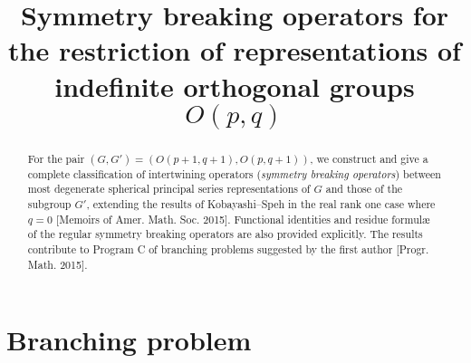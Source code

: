 \documentclass[reqno,12pt]{pja00} %
\theoremstyle{definition}
\theoremstyle{exampstyle} \newtheorem{examp}[theorem]{Theorem}
\begin{document}
\title{Symmetry breaking operators for the restriction of representations of indefinite orthogonal groups $O(p,q)$}

  \maketitle
\begin{abstract}
	For the pair $(G, G') =(O(p+1, q+1), O(p,q+1))$, we construct and give a complete classification of intertwining operators (\textit{symmetry breaking operators})
	between
most degenerate spherical
principal series representations of 
$G$ and those of the subgroup $G'$, extending the results of Kobayashi--Speh in the real rank one case where $q=0$
 [Memoirs of Amer. Math. Soc. 2015].
Functional identities and residue formul\ae\, of the regular symmetry breaking operators are also provided 
explicitly.
The results contribute to Program C of branching problems suggested by the first author [Progr. Math. 2015].
\end{abstract}

\section{Branching problem}
\end{document}
